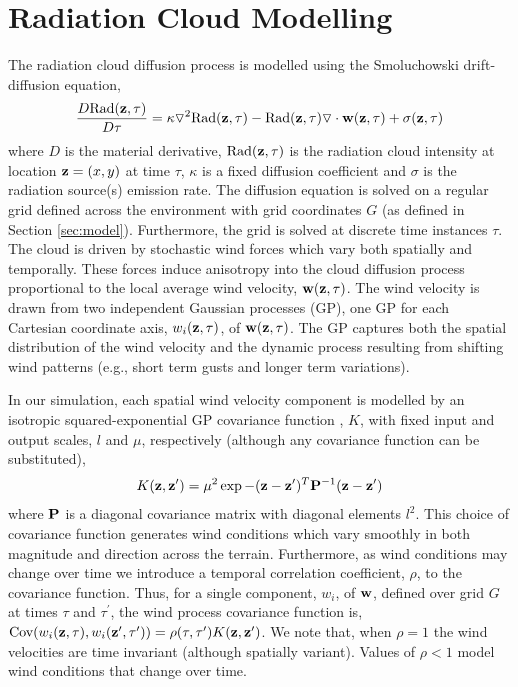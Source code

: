 \section{Radiation Cloud Modelling}\label{sec:radiation}
\noindent The radiation cloud diffusion process is modelled using the Smoluchowski drift-diffusion equation, 
\begin{eqnarray}
\frac{D \text{Rad}({\bf z}, \tau)}{D \tau}=\kappa \triangledown^2 \text{Rad}({\bf z},\tau)-\text{Rad}({\bf z},\tau)\triangledown \cdot {\bf w}({\bf z},\tau)+\sigma({\bf z},\tau)
\label{clouddyns}
\end{eqnarray}
where $D$ is the material derivative, $\text{Rad}({\bf z},\tau)$ is the radiation cloud intensity at location ${\bf z}=(x,y)$ at time $\tau$, $\kappa$ is a fixed diffusion coefficient and $\sigma$ is the radiation source(s) emission rate. The diffusion equation is solved on a regular grid defined across the environment with grid coordinates $G$ (as defined in Section \ref{sec:model}).  Furthermore, the grid is solved at discrete time instances $\tau$.  The cloud is driven by stochastic wind forces which vary both spatially and temporally.  These forces induce anisotropy into the cloud diffusion process  proportional to the local average wind velocity, ${\bf w}({\bf z},\tau)$.  The wind velocity is drawn from two independent Gaussian processes (GP), one GP for each Cartesian coordinate axis, $w_i({\bf z},\tau)$, of ${\bf w}({\bf z},\tau)$.  The GP captures both the spatial distribution of the wind velocity and the dynamic process resulting from shifting wind patterns (e.g., short term gusts and longer term variations). 

In our simulation, each spatial wind velocity component is modelled by an isotropic squared-exponential GP covariance function \cite{rasmussen06}, $K$, with fixed input and output scales, $l$ and $\mu$, respectively (although any covariance function can be substituted),
\begin{eqnarray*}
K({\bf z},{\bf z}^\prime)=\mu^2\exp -({\bf z}-{\bf z}^\prime)^T {\bf P}^{-1}({\bf z}-{\bf z}^\prime)
\end{eqnarray*}
where ${\bf P}$ is a diagonal covariance matrix with diagonal elements $l^2$.  This choice of covariance function generates wind conditions which vary smoothly in both magnitude and direction across the terrain.  Furthermore, as wind conditions may change over time we introduce a temporal correlation coefficient, $\rho$, to the covariance function.  Thus, for a single component, $w_i$, of ${\bf w}$, defined over grid $G$ at times $\tau$ and $\tau^\prime$, the wind process covariance function is, $\text{Cov}(w_i({\bf z},\tau),w_i({\bf z^\prime},\tau^\prime))=\rho(\tau,\tau^\prime) K({\bf z},{\bf z}^\prime)$.  We note that, when $\rho=1$ the wind velocities are time invariant (although spatially variant).  Values of $\rho<1$ model wind conditions that change over time.


